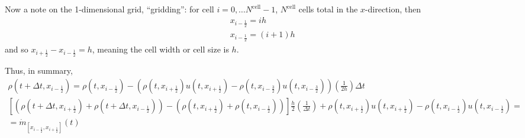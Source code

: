 \documentclass[10pt]{amsart}
\begin{document}
\begin{multicols*}{2}
Now a note on the 1-dimensional grid, ``gridding'': for cell $i=0, \dots N^{\text{cell}} -1$, $N^{\text{cell}}$ cells total in the $x$-direction, then
\[
\begin{aligned}
  & x_{i-\frac{1}{2} } = ih \\ 
  & x_{i-\frac{1}{2} } = (i+1)h 
  \end{aligned}
\]
and so $x_{i+\frac{1}{2} } - x_{i-\frac{1}{2} } = h$, meaning the cell width or cell size is $h$.

Thus, in summary, 
\begin{equation}
\begin{gathered}
  \rho(t+\Delta t,x_{i-\frac{1}{2} }) = \rho(t,x_{i-\frac{1}{2} }) - ( \rho(t,x_{i+\frac{1}{2} })u(t,x_{i+\frac{1}{2} } ) - \rho(t,x_{i-\frac{3}{2} })u(t,x_{i-\frac{3}{2} } ) )\left( \frac{1}{2h} \right) \Delta t \\
  \left[ (\rho(t+\Delta t, x_{i+\frac{1}{2} } ) + \rho(t+\Delta t, x_{i-\frac{1}{2} } ) ) - (\rho(t, x_{i+\frac{1}{2} } ) + \rho(t, x_{i-\frac{1}{2} } ) ) \right] \frac{h}{2} \left( \frac{1}{\Delta t} \right) + \rho(t,x_{i+\frac{1}{2} } )u(t,x_{i+\frac{1}{2} } ) - \rho(t,x_{i-\frac{1}{2} } )u(t,x_{i-\frac{1}{2} } ) = \\
    = \dot{m}_{[x_{i-\frac{1}{2} }, x_{i+\frac{1}{2} }] }(t)
  \end{gathered}
  \end{equation}


\end{multicols*}
\end{document}
